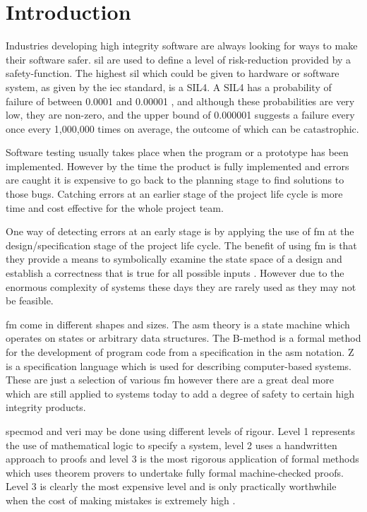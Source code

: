 
\chapter{Introduction}
\label{ch:introduction}

Industries developing high integrity software are always looking for ways to
make their software safer. \gls{sil} are used to define a level of
risk-reduction provided by a safety-function. The highest \gls{sil}
\cite{siliso} which could be given to hardware or software system, as
given by the \gls{iec} \cite{iec} standard, is a SIL4. A SIL4 has a probability
of failure of between 0.0001 and 0.00001 \cite{IEC61508}, and although these
probabilities are very low, they are non-zero, and the upper bound of 0.000001
suggests a failure every once every 1,000,000 times on average, the outcome of
which can be catastrophic.

Software testing usually takes place when the program or a prototype has been
implemented. However by the time the product is fully implemented and errors are
caught it is expensive to go back to the planning stage to find solutions to
those bugs. Catching errors at an earlier stage of the project life cycle is
more time and cost effective for the whole project team.

One way of detecting errors at an early stage is by applying the use of \gls{fm}
at the design/specification stage of the project life cycle. The benefit of
using \gls{fm} is that they provide a means to symbolically examine the state
space of a design and establish a correctness that is true for all possible
inputs \cite{wifrm}. However due to the enormous complexity of systems these
days they are rarely used as they may not be feasible. 

\Gls{fm} come in different shapes and sizes. The \gls{asm} theory
\cite{Borger:2003:ASM:829603} is a state machine which operates on states or
arbitrary data structures. The B-method \cite{bmeth} is a formal method for the
development of program code from a specification in the \gls{asm} notation. Z
\cite{spiveyreferencemanual} is a specification language which is used for
describing computer-based systems. These are just a selection of various
\gls{fm} however there are a great deal more which are still applied to systems
today to add a degree of safety to certain high integrity products.

\Gls{specmod} and \gls{veri} may be done using different levels of rigour. Level
1 represents the use of mathematical logic to specify a system, level 2 uses a
handwritten approach to proofs and level 3 is the most rigorous application of
formal methods which uses theorem provers to undertake fully formal
machine-checked proofs. Level 3 is clearly the most expensive level and is only
practically worthwhile when the cost of making mistakes is extremely high
\cite{encyclopedia}.

